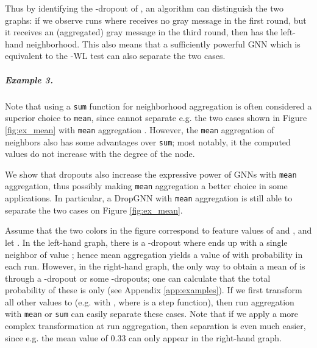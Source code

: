 \documentclass{article}
\begin{document}
Thus by identifying the -dropout of , an algorithm can distinguish the two graphs: if we observe runs where  receives no gray message in the first round, but it receives an (aggregated) gray message in the third round, then  has the left-hand neighborhood. This also means that a sufficiently powerful GNN which is equivalent to the -WL test can also separate the two cases.

\subparagraph*{Example 3.} Note that using a \texttt{sum} function for neighborhood aggregation is often considered a superior choice to \texttt{mean}, since  cannot separate e.g. the two cases shown in Figure \ref{fig:ex_mean} with \texttt{mean} aggregation \citep{GIN}. However, the \texttt{mean} aggregation of neighbors also has some advantages over \texttt{sum}; most notably, it the computed values do not increase with the degree of the node.

We show that dropouts also increase the expressive power of GNNs with \texttt{mean} aggregation, thus possibly making \texttt{mean} aggregation a better choice in some applications. In particular, a DropGNN with \texttt{mean} aggregation is still able to separate the two cases on Figure \ref{fig:ex_mean}.

Assume that the two colors in the figure correspond to feature values of  and , and let . In the left-hand graph, there is a -dropout where  ends up with a single neighbor of value ; hence mean aggregation yields a value of  with probability  in each run. However, in the right-hand graph, the only way to obtain a mean of  is through a -dropout or some -dropouts; one can calculate that the total probability of these is only  (see Appendix \ref{app:examples}). If we first transform all other values to  (e.g. with , where  is a step function), then run aggregation with \texttt{mean} or \texttt{sum} can easily separate these cases. Note that if we apply a more complex transformation at run aggregation, then separation is even much easier, since e.g. the mean value of 0.33 can only appear in the right-hand graph.
\end{document}
